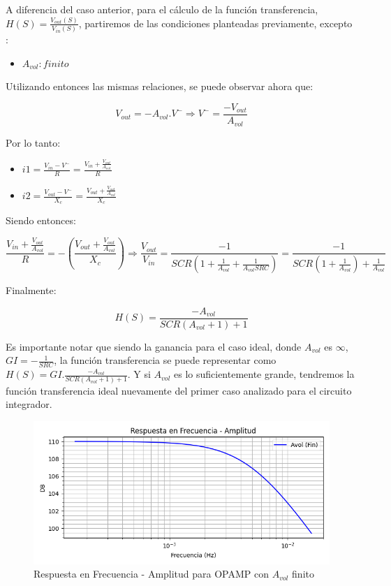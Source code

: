 A diferencia del caso anterior, para el cálculo de la función transferencia, $H(S) = \frac{V_{out} (S)}{V_{in} (S)}$, partiremos de las condiciones planteadas previamente, excepto
:

\begin{itemize}
	\item $A_{vol}: finito$
\end{itemize}

Utilizando entonces las mismas relaciones, se puede observar ahora que:


$$V_{out}=-A_{vol}.V^{-} \Longrightarrow V^{-} = \frac{-V_{out}}{A_{vol}}$$ 


Por lo tanto:

\begin{itemize}
	\item $i1 = \frac {V_{in}-V^{-}}{R} =  \frac {V_{in} + \frac{V_{out}}{A_{vol}}}{R}$
	\item $i2 = \frac {V_{out}-V^{-}}{X_c} = \frac {V_{out} + \frac{V_{out}}{A_{vol}}}{X_c}$
\end{itemize}

Siendo entonces:

$$ \frac {V_{in} + \frac{V_{out}}{A_{vol}}}{R} = -(\frac {V_{out} + \frac{V_{out}}{A_{vol}}}{X_c})
\Longrightarrow \frac{V_{out}}{V_{in}} = \frac{-1}{SCR(1+\frac{1}{A_{vol}}+\frac{1}{A_{vol}SRC})} = \frac{-1}{SCR(1+\frac{1}{A_{vol}})+\frac{1}{A_{vol}}}$$

Finalmente:

$$H(S)= \frac{-A_{vol}}{SCR(A_{vol}+1)+1}$$

Es importante notar que siendo la ganancia para el caso ideal, donde $A_{vol}$ es $\infty$, $ GI = - \frac{1}{SRC}$,  la función
transferencia se puede representar como $H(S) = GI. \frac{-A_{vol}}{SCR(A_{vol}+1)+1}$. Y
si $A_{vol}$ es lo suficientemente grande, tendremos la función transferencia ideal nuevamente del primer caso analizado para el circuito integrador.

\begin{figure}[H]
    \centering 
    \includegraphics [scale=1] {../Ejercicio3-CircuitoIntegradoresyDerivadores/Imagenes/teorico-avol-fin-integrador-amplitud.png} 
    \caption{Respuesta en Frecuencia - Amplitud para OPAMP con $A_{vol}$ finito}
    \label{fig:emptyPlotTool}
\end{figure}

